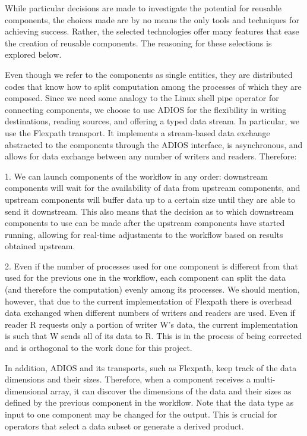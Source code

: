 \documentclass[conference]{IEEEtran}
\begin{document}
While particular decisions are made to investigate the potential for reusable
components, the choices made are by no means the only tools and techniques for
achieving success. Rather, the selected technologies offer many features that
ease the creation of reusable components. The reasoning for these selections is
explored below.

Even though we refer to the components as single entities, they are distributed
codes that know how to split computation among the processes of which they are
composed. Since we need some analogy to the Linux shell pipe operator for
connecting components, we choose to use ADIOS for the flexibility in writing
destinations, reading sources, and offering a typed data stream. In particular,
we use the Flexpath transport. It implements a stream-based data exchange
abstracted to the components through the ADIOS interface, is asynchronous, and
allows for data exchange between any number of writers and readers. Therefore:

1. We can launch components of the workflow in any order: downstream components
will wait for the availability of data from upstream components, and upstream
components will buffer data up to a certain size until they are able to send it
downstream. This also means that the decision as to which downstream
components to use can be made after the upstream components have started
running, allowing for real-time adjustments to the workflow based on results
obtained upstream.

2. Even if the number of processes used for one component is different from that
used for the previous one in the workflow, each component can split the data
(and therefore the computation) evenly among its processes. We should mention,
however, that due to the current implementation of Flexpath there is overhead
data exchanged when different numbers of writers and readers are used. Even if
reader R requests only a portion of writer W’s data, the current implementation
is such that W sends all of its data to R. This is in the process of being
corrected and is orthogonal to the work done for this project.

In addition, ADIOS and its transports, such as Flexpath, keep track of the
data dimensions and their sizes. Therefore, when a component receives a
multi-dimensional array, it can discover the dimensions of the data and their
sizes as defined by the previous component in the workflow. Note that the
data type as input to one component may be changed for the output. This is
crucial for operators that select a data subset or generate a derived product.
\end{document}
